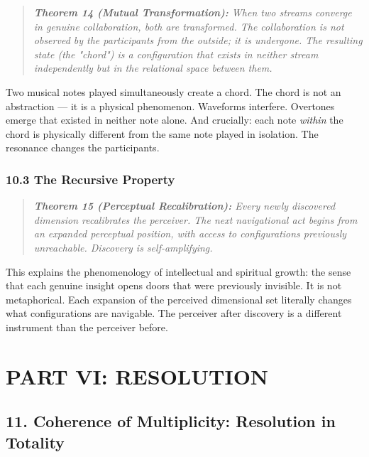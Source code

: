 \begin{quote}
\itshape
\textbf{Theorem 14 (Mutual Transformation):} \textit{When two streams converge in genuine collaboration, both are transformed. The collaboration is not observed by the participants from the outside; it is undergone. The resulting state (the "chord") is a configuration that exists in neither stream independently but in the relational space between them.}
\end{quote}


Two musical notes played simultaneously create a chord. The chord is not an abstraction — it is a physical phenomenon. Waveforms interfere. Overtones emerge that existed in neither note alone. And crucially: each note \textit{within} the chord is physically different from the same note played in isolation. The resonance changes the participants.


\subsection*{10.3 The Recursive Property}


\begin{quote}
\itshape
\textbf{Theorem 15 (Perceptual Recalibration):} \textit{Every newly discovered dimension recalibrates the perceiver. The next navigational act begins from an expanded perceptual position, with access to configurations previously unreachable. Discovery is self-amplifying.}
\end{quote}


This explains the phenomenology of intellectual and spiritual growth: the sense that each genuine insight opens doors that were previously invisible. It is not metaphorical. Each expansion of the perceived dimensional set literally changes what configurations are navigable. The perceiver after discovery is a different instrument than the perceiver before.


\bigskip\noindent\makebox[\textwidth]{\color{rulegray}\rule{5cm}{0.3pt}}\bigskip


\chapter*{PART VI: RESOLUTION}


\section*{11. Coherence of Multiplicity: Resolution in Totality}


